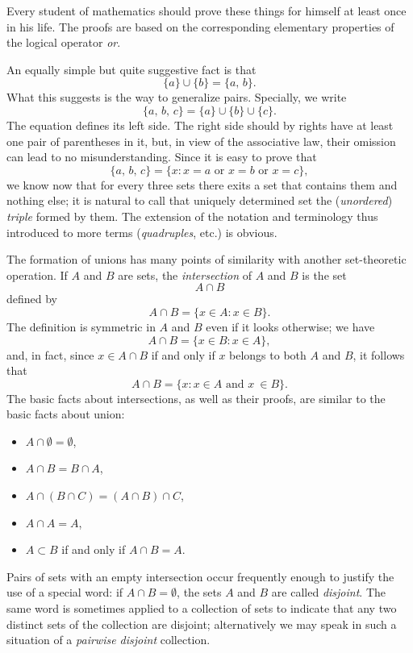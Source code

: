 Every student of mathematics should prove these things for himself at least once in his life. The proofs are based on the corresponding elementary properties of the logical operator \textit{or}.

An equally simple but quite suggestive fact is that
\[
	\{a\} \cup \{b\} = \{a, \, b\}.
\]
What this suggests is the way to generalize pairs. Specially, we write
\[
	\{a, \, b, \, c\} = \{a\} \cup\{b\} \cup \{c\}.
\]
The equation defines its left side. The right side should by rights have at least one pair of parentheses in it, but, in view of the associative law, their omission can lead to no misunderstanding. Since it is easy to prove that
\[
	\{a, \, b, \, c\} = \{ x : x = a \text{ or } x = b \text{ or } x = c\},
\]
we know now that for every three sets there exits a set that contains them and nothing else; it is natural to call that uniquely determined set the (\textit{unordered}) \textit{triple} formed by them. The extension of the notation and terminology thus introduced to more terms (\textit{quadruples}, etc.) is obvious.

The formation of unions has many points of similarity with another set-theoretic operation. If $A$ and $B$ are sets, the \textit{intersection} of $A$ and $B$ is the set
\[
	A \cap B
\]
defined by
\[
	A \cap B = \{ x \in A : x \in B\}.
\]
The definition is symmetric in $A$ and $B$ even if it looks otherwise; we have
\[
	A \cap B = \{ x \in B : x \in A\},
\]
and, in fact, since $x \in A \cap B$ if and only if $x$ belongs to both $A$ and $B$, it follows that
\[
	A \cap B = \{ x : x \in A \text{ and } x \ \in B\}.
\]
The basic facts about intersections, as well as their proofs, are similar to the basic facts about union:

\begin{itemize}
	\item $A \cap \emptyset = \emptyset$,
	\item $A \cap B = B \cap A$,
	\item $A \cap (B \cap C) = (A \cap B) \cap C$,
	\item $A \cap A = A$,
	\item $A \subset B$ if and only if $A \cap B = A$.
\end{itemize}

Pairs of sets with an empty intersection occur frequently enough to justify the use of a special word: if $A \cap B = \emptyset$, the sets $A$ and $B$ are called \textit{disjoint}. The same word is sometimes applied to a collection of sets to indicate that any two distinct sets of the collection are disjoint; alternatively we may speak in such a situation of a \textit{pairwise disjoint} collection.

